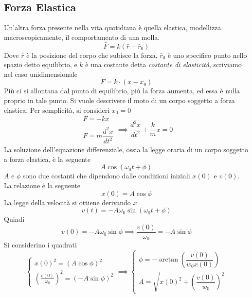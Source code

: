 \documentclass[10pt, letterpaper]{report}
\begin{document}
\subsection{Forza Elastica}
Un'altra forza presente nella vita quotidiana è quella elastica, modellizza macroscopicamente, il comportamento 
di una molla. $$ \bar F = k(\bar r - \bar r_0)$$
Dove $\bar r$ è la posizione del corpo che subisce la forza, $\bar r_0$ è uno specifico punto nello spazio 
detto equilibrio, e $k$ è una costante detta \textit{costante di elasticità}, scriviamo nel caso unidimensionale 
$$ F=k\cdot(x-x_0)$$
Più ci si allontana dal punto di equilibrio, più la forza aumenta, ed essa è nulla proprio in 
tale punto. Si vuole descrivere il moto di un corpo soggetto a forza 
elastica. Per semplicità, si consideri $x_0=0$
$$ \begin{matrix}F=-kx\\ \\ F=m\dfrac{d^2x}{dt^2} 
\end{matrix}\implies 
\frac{d^2x}{dt^2}{}+\frac{k}{m}x=0$$
La soluzione dell'equazione differenziale, ossia la legge oraria di un corpo soggetto a forza elastica, 
è la seguente 
$$ A\cos(\omega_0t+\phi)$$
$A$ e $\phi$ sono due costanti che dipendono dalle condizioni iniziali $x(0)$ e $v(0)$. La relazione è la seguente 
$$ x(0)=A\cos\phi$$
La legge della velocità si ottiene derivando $x$
$$ v(t)=-A\omega_0\sin(\omega_0t+\phi)$$
Quindi 
$$ v(0)=-A\omega_0\sin\phi\implies \frac{v(0)}{\omega_0}=-A\sin\phi$$
Si considerino i quadrati 
$$\begin{cases}
    x(0)^2=(A\cos\phi)^2\\ 
   ( \frac{v(0)}{\omega_0})^2=(-A\sin\phi)^2
\end{cases}\implies \begin{cases}
    \phi=-\arctan(\dfrac{v(0)}{w_0x(0)})\\ 
    A = \sqrt{x(0)^2+(\dfrac{v(0)}{w_0})^2}
\end{cases}$$
\end{document}
